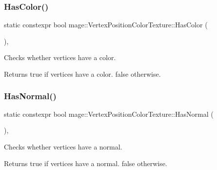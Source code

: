 \subsubsection{\texorpdfstring{Has\+Color()}{HasColor()}}
{\footnotesize\ttfamily static constexpr bool mage\+::\+Vertex\+Position\+Color\+Texture\+::\+Has\+Color (\begin{DoxyParamCaption}{ }\end{DoxyParamCaption})\hspace{0.3cm}{\ttfamily [static]}, {\ttfamily [noexcept]}}

Checks whether vertices have a color.

\begin{DoxyReturn}{Returns}
{\ttfamily true} if vertices have a color. {\ttfamily false} otherwise. 
\end{DoxyReturn}
\hypertarget{structmage_1_1_vertex_position_color_texture_ab6b754deb3139e8b669daae14ae67ba8}{}\label{structmage_1_1_vertex_position_color_texture_ab6b754deb3139e8b669daae14ae67ba8} 
\subsubsection{\texorpdfstring{Has\+Normal()}{HasNormal()}}
{\footnotesize\ttfamily static constexpr bool mage\+::\+Vertex\+Position\+Color\+Texture\+::\+Has\+Normal (\begin{DoxyParamCaption}{ }\end{DoxyParamCaption})\hspace{0.3cm}{\ttfamily [static]}, {\ttfamily [noexcept]}}

Checks whether vertices have a normal.

\begin{DoxyReturn}{Returns}
{\ttfamily true} if vertices have a normal. {\ttfamily false} otherwise. 
\end{DoxyReturn}
\hypertarget{structmage_1_1_vertex_position_color_texture_aa80fcb7271cfe6bb2d89b0a7655e8984}{}\label{structmage_1_1_vertex_position_color_texture_aa80fcb7271cfe6bb2d89b0a7655e8984} 
